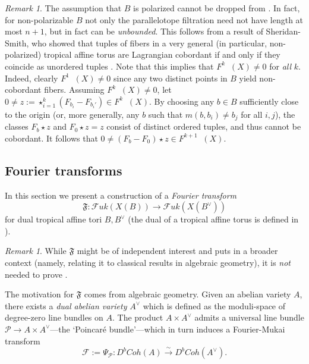 \documentclass[10pt]{amsart}
\newcounter{mainthm}
\theoremstyle{definition}
\theoremstyle{remark}
\newtheorem{remark}[thm]{Remark}
\DeclareMathOperator{\Cobfib}{\mathrm{Cob}_{\mathrm{fib}}}
\newcommand{\mcal}{\mathcal}
\def\x{\times}
\newcommand{\xra}[1]{\xrightarrow{#1}}
\begin{document}
\begin{remark}
    The assumption that $B$ is polarized cannot be dropped from .
    In fact, for non-polarizable $B$ not only the parallelotope filtration need not have length at most $n+1$, but in fact can be \emph{unbounded}.
    This follows from a result of Sheridan-Smith, who showed that tuples of fibers in a very general (in particular, non-polarized) tropical affine torus  are Lagrangian cobordant if and only if they coincide as unordered tuples \cite[Theorem 1.3]{sheridan2021lagrangian}.
    Note that this implies that $F^k\Cobfib(X) \neq 0$ for \emph{all} $k$.
    Indeed, clearly $F^1\Cobfib(X)\neq 0$ since any two distinct points in $B$ yield non-cobordant fibers.
    Assuming $F^k\Cobfib(X) \neq 0$, let $0\neq z:= \star_{i=1}^k(F_{b_i}- F_{b_i'}) \in F^k\Cobfib(X)$.
    By choosing any $b\in B$ sufficiently close to the origin (or, more generally, any $b$ such that $m(b,b_i)\neq b_j$ for all $i,j$), the classes $F_b \star z$ and  $F_0\star z = z$ consist of distinct ordered tuples, and thus cannot be cobordant. 
    It follows that $0 \neq (F_b - F_0)\star z \in F^{k+1}\Cobfib(X)$.
\end{remark}

 \subsection{Fourier transforms}\label{sec:introfourier}
In this section we present a construction of a \emph{Fourier transform}
\begin{equation*}
    \mathfrak F: \mcal Fuk(X(B)) \to \mcal Fuk(X(B^\vee))
\end{equation*}
for dual tropical affine tori $B,B^\vee$ (the dual of a tropical affine torus is defined in ).
\begin{remark}
    While $\mathfrak F$ might be of independent interest and puts  in a broader context (namely, relating it to classical results in algebraic geometry), it is \emph{not} needed to prove .
\end{remark}


The motivation for $\mathfrak F$ comes from algebraic geometry.
Given an abelian variety $A$, there exists a \emph{dual abelian variety} $A^\vee$ which is defined as the moduli-space of degree-zero line bundles on $A$.
The product $A \x A^\vee$ admits a universal line bundle $\mcal P \to A \x A^\vee$---the `Poincaré bundle'---which in turn induces a Fourier-Mukai transform \cite{huybrechts2006fourier}
$$
    \mcal F:= \Psi_{\mcal P}: D^bCoh(A) \xra{\sim} D^bCoh(A^\vee).
$$
\end{document}
